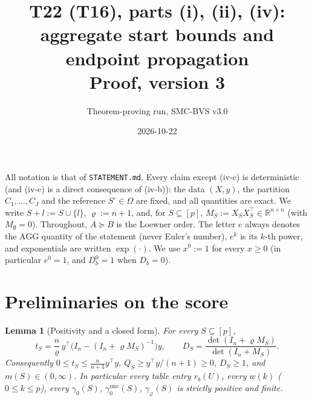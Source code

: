 \documentclass[11pt]{article}
\title{T22 (T16), parts (i), (ii), (iv): aggregate start bounds and endpoint propagation\\[2pt] \large Proof, version 3}
\author{Theorem-proving run, SMC-BVS v3.0}
\date{2026-10-22}
\newtheorem{lemma}{Lemma}
\theoremstyle{remark}
\newcommand{\unc}{\mathrm{unc}}
\newcommand{\gu}{\gamma_0^{\unc}}
\begin{document}
\maketitle

\noindent All notation is that of \texttt{STATEMENT.md}. Every claim except (iv-c) is deterministic (and (iv-c) is a direct consequence of (iv-b)): the data $(X,y)$, the partition $C_1,\dots,C_J$ and the reference $S^\circ\in\Omega$ are fixed, and all quantities are exact. We write $S+l:=S\cup\{l\}$, $\varrho:=n+1$, and, for $S\subseteq[p]$, $M_S:=X_SX_S^\top\in\mathbb{R}^{n\times n}$ (with $M_\emptyset=0$). Throughout, $A\succeq B$ is the Loewner order. The letter $e$ always denotes the AGG quantity of the statement (never Euler's number), $e^{k}$ is its $k$-th power, and exponentials are written $\exp(\cdot)$. We use $x^0:=1$ for every $x\ge0$ (in particular $e^0=1$, and $D_b^0=1$ when $D_b=0$).

\section{Preliminaries on the score}

\begin{lemma}[Positivity and a closed form]\label{lem:pos}
For every $S\subseteq[p]$,
\[
t_S=\frac{n}{\varrho}\,y^\top\bigl(I_n-(I_n+\varrho M_S)^{-1}\bigr)y,\qquad D_S=\frac{\det(I_n+\varrho M_S)}{\det(I_n+M_S)} .
\]
Consequently $0\le t_S\le \tfrac{n}{n+1}y^\top y$, $Q_S\ge y^\top y/(n+1)\ge 0$, $D_S\ge 1$, and $m(S)\in(0,\infty)$. In particular every table entry $r_b(U)$, every $w(k)$ ($0\le k\le p$), every $\gamma_0(S)$, $\gu(S)$, $\gamma_\varphi(S)$ is strictly positive and finite.
\end{lemma}
\end{document}

